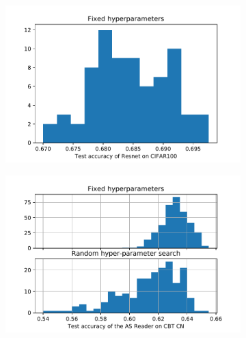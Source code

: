 \documentclass{article}
\begin{document}
 \begin{figure}[t]
        \centering
        \begin{subfigure}[b]{0.31\textwidth}
            \centering
            \includegraphics[width=\textwidth]{figures/resnet_hist.pdf} 
            \label{fig:resnet-hist}
            \caption[]{}
        \end{subfigure}
        \begin{subfigure}[b]{0.31\textwidth}
            \centering
             \includegraphics[width=\textwidth]{figures/asreader_cbt_cn.pdf}
            \label{fig:cbt-hist}
            \caption[]{}
        \end{subfigure}
        \begin{subfigure}[b]{0.31\textwidth}   
            \centering 

\end{subfigure}
\end{figure}
\end{document}
